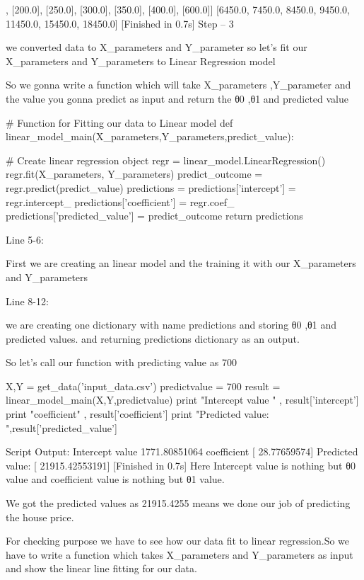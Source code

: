 \begin{framed}
 [[150.0], [200.0], [250.0], [300.0], [350.0], [400.0], [600.0]]
[6450.0, 7450.0, 8450.0, 9450.0, 11450.0, 15450.0, 18450.0]
[Finished in 0.7s] 
Step – 3
 
we converted data to X\_parameters and Y\_parameter so let’s fit our X_parameters and Y_parameters to Linear Regression model
 
So we gonna write a function which will take  X\_parameters ,Y\_parameter and the value you gonna predict  as input and return the θ0 ,θ1  and predicted value
 
 
# Function for Fitting our data to Linear model
def linear_model_main(X_parameters,Y_parameters,predict_value):

 # Create linear regression object
 regr = linear_model.LinearRegression()
 regr.fit(X_parameters, Y_parameters)
 predict_outcome = regr.predict(predict_value)
 predictions = {}
 predictions['intercept'] = regr.intercept_
 predictions['coefficient'] = regr.coef_
 predictions['predicted_value'] = predict_outcome
 return predictions
 
Line 5-6:
 
First we are creating an linear model and the training it with our X_parameters and Y_parameters
 
Line 8-12:
 
we are creating one dictionary with name predictions and storing θ0 ,θ1  and predicted values. and returning predictions dictionary as an output.
 
So let’s call our function with predicting value as 700
 
X,Y = get_data('input_data.csv')
predictvalue = 700
result = linear_model_main(X,Y,predictvalue)
print "Intercept value " , result['intercept']
print "coefficient" , result['coefficient']
print "Predicted value: ",result['predicted_value']
 
 
Script Output:
 Intercept value 1771.80851064
coefficient [ 28.77659574]
Predicted value: [ 21915.42553191]
[Finished in 0.7s] 
Here Intercept value is nothing but   θ0 value and coefficient value is nothing but  θ1 value.
 
We got the predicted values as 21915.4255 means we done our job of predicting the house price.
 
For checking purpose we have to see how our data fit to linear regression.So we have to write a function which takes X_parameters and Y_parameters as input and show the linear line fitting for our data.
 

\end{framed}
